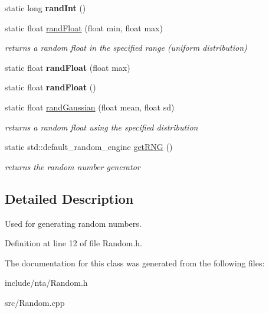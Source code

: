 \begin{DoxyCompactItemize}
\mbox{\label{classnta_1_1Random_aa380bcf4be06bc5b5e4707b7ae5a7907}} 
static long {\bfseries rand\+Int} ()
\item 
\mbox{\label{classnta_1_1Random_a102ed2efec77f974731e5dcdb428174a}} 
static float \hyperlink{classnta_1_1Random_a102ed2efec77f974731e5dcdb428174a}{rand\+Float} (float min, float max)
\begin{DoxyCompactList}\small\item\em returns a random float in the specified range (uniform distribution) \end{DoxyCompactList}\item 
\mbox{\label{classnta_1_1Random_a6820a1c36b820baa68f7bdb2f5f5bf88}} 
static float {\bfseries rand\+Float} (float max)
\item 
\mbox{\label{classnta_1_1Random_aae9df8240d99108188bd6cb223b384a2}} 
static float {\bfseries rand\+Float} ()
\item 
\mbox{\label{classnta_1_1Random_a6e12bc86e5851f01d70debf422746e0e}} 
static float \hyperlink{classnta_1_1Random_a6e12bc86e5851f01d70debf422746e0e}{rand\+Gaussian} (float mean, float sd)
\begin{DoxyCompactList}\small\item\em returns a random float using the specified distribution \end{DoxyCompactList}\item 
\mbox{\label{classnta_1_1Random_a70719bc927413d2df83593c243499c88}} 
static std\+::default\+\_\+random\+\_\+engine \hyperlink{classnta_1_1Random_a70719bc927413d2df83593c243499c88}{get\+R\+NG} ()
\begin{DoxyCompactList}\small\item\em returns the random number generator \end{DoxyCompactList}\end{DoxyCompactItemize}


\subsection{Detailed Description}
Used for generating random numbers. 

Definition at line 12 of file Random.\+h.



The documentation for this class was generated from the following files\+:\begin{DoxyCompactItemize}
\item 
include/nta/Random.\+h\item 
src/Random.\+cpp\end{DoxyCompactItemize}
